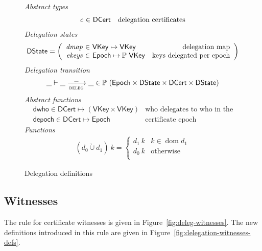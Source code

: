 \documentclass[11pt,a4paper]{article}
\DeclareMathOperator{\dom}{dom}
\newcommand{\powerset}[1]{\mathbb{P}~#1}
\newcommand{\unionoverride}{\mathbin{\underrightarrow\cup}}
\newcommand{\var}[1]{\mathit{#1}}
\newcommand{\fun}[1]{\mathsf{#1}}
\newcommand{\type}[1]{\mathsf{#1}}
\newcommand{\trans}[2]{\xlongrightarrow[\textsc{#1}]{#2}}
\newcommand{\VKey}{\type{VKey}}
\newcommand{\DCert}{\type{DCert}}
\newcommand{\DState}{\type{DState}}
\newcommand{\Epoch}{\type{Epoch}}
\begin{document}
\begin{figure}
  \emph{Abstract types}
  \begin{equation*}
    \begin{array}{r@{~\in~}lr}
      c & \DCert  & \text{delegation certificates}\\
    \end{array}
  \end{equation*}
  \emph{Delegation states}
  \begin{equation*}
    \DState =
    \left(\begin{array}{r@{~\in~}lr}
      \var{dmap} & \VKey \mapsto \VKey & \text{delegation map}\\
      \var{ekeys} & \Epoch \mapsto \powerset{\VKey} & \text{keys delegated per epoch}
    \end{array}\right)
  \end{equation*}
  \emph{Delegation transition}
  \begin{equation*}
    \_ \vdash \_ \trans{deleg}{\_} \_ \in
      \powerset (\Epoch \times \DState \times \DCert \times \DState)
  \end{equation*}
  \emph{Abstract functions}
  \begin{align*}
    & \fun{dwho} \in \DCert \mapsto (\VKey \times \VKey) & \text{who delegates to who in the certificate}\\
    & \fun{depoch} \in \DCert \mapsto \Epoch & \text{certificate epoch}
  \end{align*}
  \emph{Functions}
  \begin{align*}
    (d_0 \unionoverride d_1)~k=
    \begin{cases}
      d_1~k & k \in \dom d_1\\
      d_0~k & \text{otherwise}\\
    \end{cases}
  \end{align*}
  \caption{Delegation definitions}
  \label{fig:delegation-defs}
\end{figure}

\subsection{Witnesses}
\label{sec:delegation-witnesses}

The rule for certificate witnesses is given in
Figure~\ref{fig:deleg-witnesses}. The new definitions introduced in this rule
are given in Figure~\ref{fig:delegation-witnesses-defs}.
\end{document}

